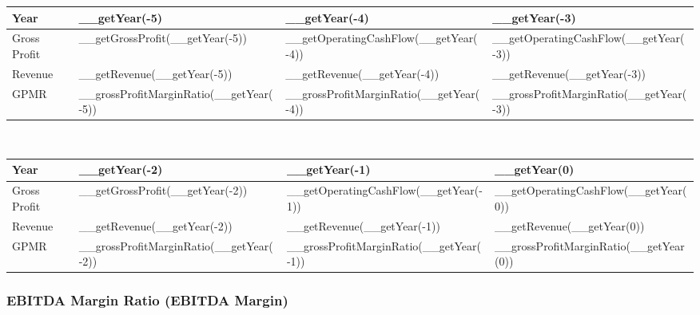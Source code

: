\begin{tabularx}{\textwidth}{|X|X|X|X|}
 \hline
 Year                      & __getYear(-5)                           & __getYear(-4)                           & __getYear(-3)                           \\
 \hline
 Gross Profit              & __getGrossProfit(__getYear(-5))         & __getOperatingCashFlow(__getYear(-4))   & __getOperatingCashFlow(__getYear(-3))   \\
 Revenue                   & __getRevenue(__getYear(-5))             & __getRevenue(__getYear(-4))             & __getRevenue(__getYear(-3))             \\
 \rowcolor{lightgray} GPMR & __grossProfitMarginRatio(__getYear(-5)) & __grossProfitMarginRatio(__getYear(-4)) & __grossProfitMarginRatio(__getYear(-3)) \\
 \hline
\end{tabularx}\\

\begin{tabularx}{\textwidth}{|X|X|X|X|}
 \hline
 Year                      & __getYear(-2)                           & __getYear(-1)                           & __getYear(0)                           \\
 \hline
 Gross Profit              & __getGrossProfit(__getYear(-2))         & __getOperatingCashFlow(__getYear(-1))   & __getOperatingCashFlow(__getYear(0))   \\
 Revenue                   & __getRevenue(__getYear(-2))             & __getRevenue(__getYear(-1))             & __getRevenue(__getYear(0))             \\
 \rowcolor{lightgray} GPMR & __grossProfitMarginRatio(__getYear(-2)) & __grossProfitMarginRatio(__getYear(-1)) & __grossProfitMarginRatio(__getYear(0)) \\
 \hline
\end{tabularx}

\subsubsection{EBITDA Margin Ratio (EBITDA Margin)}

